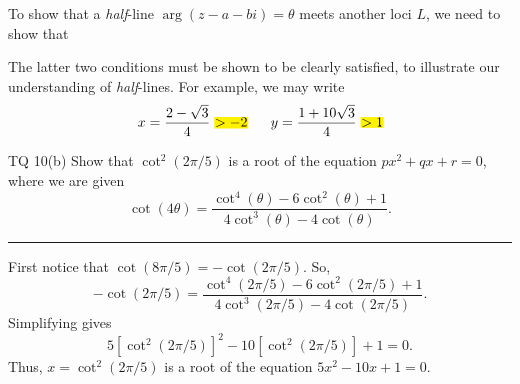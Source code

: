\documentclass[oneside]{book}
\newcommand{\highlight}[2][red!50]{\mathpalette{\highlightwithstyle[#1]}{#2}}
\newcommand{\highlightwithstyle}[3][red!50]{
  \begingroup                         %
    \sbox0{$\mathsurround 0pt #2#3$}%
    \setlength{\fboxsep}{.5pt}        %
    \sbox2{\hspace{-.5pt}%
      \colorbox{#1}{\usebox0}%
    }%
    \dp2=\dp0 \ht2=\ht0 \wd2=\wd0     %
    \box2                             %
  \endgroup                           %
}
\begin{document}
\begin{note}
  To show that a \emph{half}-line \(\arg(z-a-bi)=\theta\) meets another loci \(L\), we need to show that 
  The latter two conditions must be shown to be clearly satisfied, to illustrate our understanding of \emph{half}-lines. For example, we may write
  \[x=\frac{2-\sqrt{3}}{4}\highlight[yellow]{>-2} \qquad y=\frac{1+10\sqrt{3}}{4}\highlight[yellow]{>1}.\]
\end{note}
\begin{example}{TQ 10(b)}{}
  Show that \(\cot^2(2\pi/5)\) is a root of the equation \(px^2+qx+r=0\), where we are given 
  \[\cot(4\theta)=\frac{\cot^4(\theta)-6\cot^2(\theta)+1}{4\cot^3(\theta)-4\cot(\theta)}.\]
  \rule{20cm-137.0549pt}{0.05mm}
  First notice that \(\cot(8\pi/5)=-\cot(2\pi/5)\). So, 
  \[-\cot(2\pi/5)=\frac{\cot^4(2\pi/5)-6\cot^2(2\pi/5)+1}{4\cot^3(2\pi/5)-4\cot(2\pi/5)}.\]
  Simplifying gives 
  \[5[\cot^2(2\pi/5)]^2-10[\cot^2(2\pi/5)]+1=0.\]
  Thus, \(x=\cot^2(2\pi/5)\) is a root of the equation \(5x^2-10x+1=0\). 
\end{example}
\end{document}
